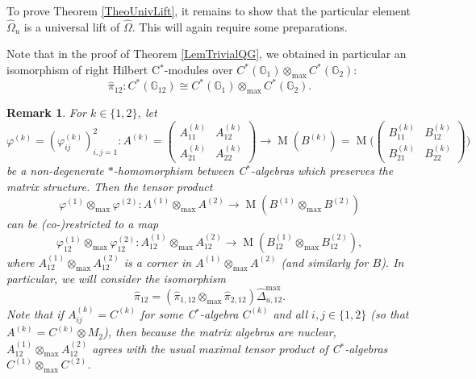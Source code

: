 \documentclass[reqno]{amsart}
\numberwithin{equation}{section}
\newtheorem{Rem}[Theorem]{Remark}
\newcommand{\G}{\mathbb{G}}
\newcommand{\vp}{\varphi}
\newcommand{\Mult}{\operatorname{M}}
\begin{document}
To prove Theorem \ref{TheoUnivLift}, it remains to show that the particular element $\hat{\Omega}_u$ is a universal lift of $\hat{\Omega}$. This will again require some preparations. 

Note that in the proof of Theorem \ref{LemTrivialQG}, we obtained in particular an isomorphism of right Hilbert C$^*$-modules over $C^*(\G_1)\otimes_{\max} C^*(\G_2)$: 
\begin{equation}\label{EqHatPi12}
\hat{\pi}_{12} \colon C^*(\G_{12}) \cong C^*(\G_1)\otimes_{\max} C^*(\G_2). 
\end{equation}

\begin{Rem}
For $k\in\{1,2\}$, let
\[
\vp^{(k)}=(\vp_{ij}^{(k)})_{i,j=1}^{2}\colon A^{(k)}=\begin{pmatrix}
A_{11}^{(k)} & A_{12}^{(k)} \\ A_{21}^{(k)} & A_{22}^{(k)}
\end{pmatrix}\rightarrow \Mult(B^{(k)})=\Mult \biggl(\! \begin{pmatrix} B_{11}^{(k)} & B_{12}^{(k)} \\ B_{21}^{(k)} & B_{22}^{(k)} \end{pmatrix} \!\biggr)
\]
be a non-degenerate $*$-homomorphism between C$^*$-algebras which preserves the matrix structure. Then the tensor product 
\[
\vp^{(1)}\otimes_{\max}\vp^{(2)}\colon A^{(1)}\otimes_{\max} A^{(2)}\rightarrow \Mult(B^{(1)}\otimes_{\max} B^{(2)})
\] 
can be (co-)restricted to a map 
\[
\vp^{(1)}_{12}\otimes_{\max} \vp^{(2)}_{12}\colon A^{(1)}_{12}\otimes_{\max} A^{(2)}_{12}\rightarrow \Mult( B^{(1)}_{12}\otimes_{\max} B^{(2)}_{12}),
\] 
where $A^{(1)}_{12}\otimes_{\max} A^{(2)}_{12}$ is a corner in $A^{(1)}\otimes_{\max} A^{(2)}$ (and similarly for $B$). In particular, we will consider the isomorphism
\[
\hat{\pi}_{12} = (\hat{\pi}_{1,12}\otimes_{\max}\hat{\pi}_{2,12})\hat{\Delta}_{u,12}^{\max}.
\]
Note that if $A^{(k)}_{ij}=C^{(k)}$ for some C$^*$-algebra $C^{(k)}$ and all $i,j\in \{1,2\}$ (so that $A^{(k)}=C^{(k)}\otimes M_2$), then because the matrix algebras are nuclear, $A^{(1)}_{12}\otimes_{\max} A^{(2)}_{12}$ agrees with the usual maximal tensor product of C$^*$-algebras $C^{(1)}\otimes_{\max} C^{(2)}$.
\end{Rem}
\end{document}
